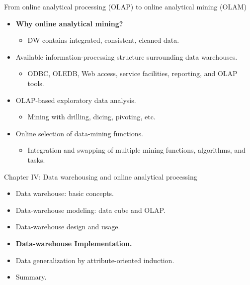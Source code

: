 \documentclass[aspectratio=169,t]{beamer}
\begin{document}
  { 
    \begin{frame}{From online analytical processing (OLAP) to online analytical mining (OLAM)}
        \begin{itemize}
            \item \textbf{Why online analytical mining?}
            \begin{itemize}
              \item DW contains integrated, consistent, cleaned data.
            \end{itemize}
            \item Available information-processing structure surrounding data warehouses.
            \begin{itemize}
              \item ODBC, OLEDB, Web access, service facilities, reporting, and OLAP tools.
            \end{itemize}
            \item OLAP-based exploratory data analysis.
            \begin{itemize}
              \item Mining with drilling, dicing, pivoting, etc.
            \end{itemize}
            \item Online selection of data-mining functions.
            \begin{itemize}
              \item Integration and swapping of multiple mining functions, algorithms, and tasks.
            \end{itemize}
        \end{itemize}
    \end{frame}
  }

  { 
    \begin{frame}{Chapter IV: Data warehousing and online analytical processing}
        \begin{itemize}
            \item Data warehouse: basic concepts.
            \item Data-warehouse modeling: data cube and OLAP.
            \item Data-warehouse design and usage.
            \item \textbf{Data-warehouse Implementation.}
            \item Data generalization by attribute-oriented induction.
            \item Summary.
        \end{itemize}
    \end{frame}
  }
\end{document}
